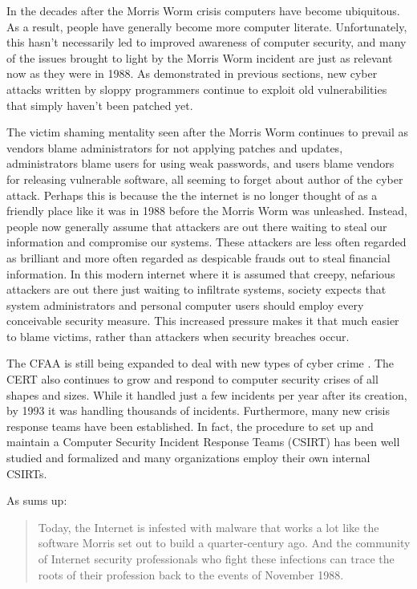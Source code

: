 In the decades after the Morris Worm crisis computers have become ubiquitous.
As a result, people have generally become more computer literate. Unfortunately,
this hasn't necessarily led to improved awareness of computer security, and many of the
issues brought to light by the Morris Worm incident are just as relevant now as
they were in 1988. As demonstrated in previous sections, new cyber attacks
written by sloppy programmers continue to exploit old vulnerabilities that
simply haven't been patched yet.

The victim shaming mentality seen after the Morris Worm continues
to prevail as vendors blame administrators for not applying patches and
updates, administrators blame users for using weak passwords, and users blame
vendors for releasing vulnerable software, all seeming to forget about author
of the cyber attack. Perhaps this is because the the internet is no longer
thought of as a friendly place like it was in 1988 before the Morris Worm was
unleashed. Instead, people now generally assume that attackers are out there
waiting to steal our information and compromise our systems.
These attackers are less often regarded as brilliant and more often
regarded as despicable frauds out to steal financial information. In this modern
internet where it is assumed that creepy, nefarious attackers are out there just
waiting to infiltrate systems, society expects that system administrators and
personal computer users should employ every conceivable security measure. This
increased pressure makes it that much easier to blame victims, rather than
attackers when security breaches occur.

The CFAA is still being expanded to deal with new types of cyber crime
\cite{adams_controlling_1996}. The CERT also continues to grow and respond to
computer security crises of all shapes and sizes. While it handled just a few
incidents per year after its creation, by 1993 it was handling thousands of
incidents\cite{fithen_cert_1994}. Furthermore, many new crisis response teams
have been established. In fact, the procedure to set up and maintain a Computer
Security Incident Response Teams (CSIRT) has been well studied and formalized
and many organizations employ their own internal CSIRTs. 

As \cite{lee_washpost_2013} sums up:
\begin{quote}
Today, the Internet is infested with malware that works a lot like the software
Morris set out to build a quarter-century ago. And the community of Internet
security professionals who fight these infections can trace the roots of their
profession back to the events of November 1988.
\end{quote}
